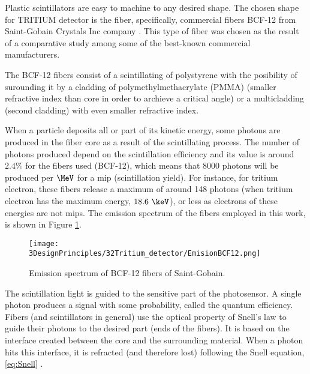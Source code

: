 Plastic scintillators are easy to machine to any desired shape. The chosen shape for TRITIUM detector is the fiber, specifically, commercial fibers BCF-12 from Saint-Gobain Crystals Inc company \cite{DataSheetBCF12Fiber}. This type of fiber was chosen as the result of a comparative study \cite{TFGAlberto} among some of the best-known commercial manufacturers. 


The BCF-12 fibers consist of a scintillating of polystyrene with the posibility of surounding it by a cladding of polymethylmethacrylate (PMMA) (smaller refractive index than core in order to archieve a critical angle) or a multicladding (second cladding) with even smaller refractive index.

When a particle deposits all or part of its kinetic energy, some photons are produced in the fiber core as a result of the scintillating process. The number of photons produced depend on the scintillation efficiency and its value is around $2.4\%$ for the fibers used (BCF-12), which means that $8000$ photons will be produced per $\MeV$ for a mip (scintillation yield). For instance, for tritium electron, these fibers release a maximum of around 148 photons (when tritium electron has the maximum energy, $18.6~\keV$), or less as electrons of these energies are not mips. The emission spectrum of the fibers employed in this work, is shown in Figure \ref{fig:EmissionSpectrumFibers}.

\begin{figure}[htbp]
\centering
\texttt{[image: 3DesignPrinciples/32Tritium\_detector/EmisionBCF12.png]}
\caption{Emission spectrum of BCF-12 fibers of Saint-Gobain.\label{fig:EmissionSpectrumFibers}~\cite{DataSheetBCF12Fiber}}
\end{figure}

The scintillation light is guided to the sensitive part of the photosensor. A single photon produces a signal with some probability, called the quantum efficiency. Fibers (and scintillators in general) use the optical property of Snell's law \cite{Snell} to guide their photons to the desired part (ends of the fibers). It is based on the interface created between the core and the surrounding material. When a photon hits this interface, it is refracted (and therefore lost) following the Snell equation, \ref{eq:Snell} \cite{Snell}. 


